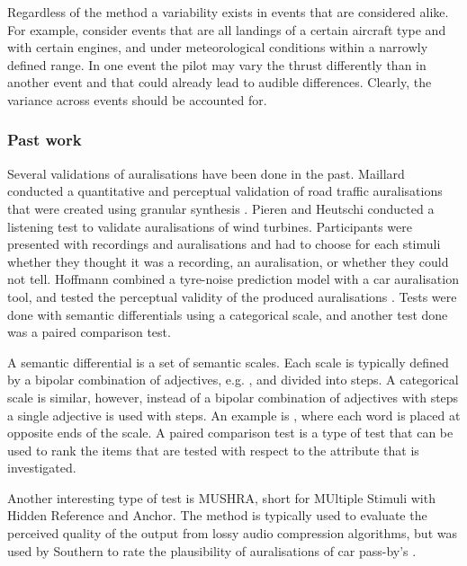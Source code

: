 Regardless of the method a variability exists in events that are considered
alike. For example, consider events that are all landings of a certain aircraft
type and with certain engines, and under meteorological conditions within a narrowly
defined range. In one event the pilot may vary the thrust differently than in
another event and that could already lead to audible differences.
Clearly, the variance across events should be accounted for.

\subsubsection*{Past work}
Several validations of auralisations have been done in the past. Maillard
conducted a quantitative and perceptual validation of road traffic auralisations
that were created using granular synthesis \cite{Maillard2014}. Pieren and
Heutschi conducted a listening test to validate auralisations of
wind turbines. Participants were presented with recordings and auralisations and
had to choose for each stimuli whether they thought it was a recording, an
auralisation, or whether they could not tell. Hoffmann combined a tyre-noise
prediction model with a car auralisation tool, and tested the perceptual
validity of the produced auralisations \cite{Hoffmann2016a,Hoffmann2016}. Tests
were done with semantic differentials using a categorical scale, and another
test done was a paired comparison test.

A semantic differential is a set of semantic scales. Each scale is typically
defined by a bipolar combination of adjectives, e.g. , and
divided into steps. A categorical scale is similar, however, instead of a
bipolar combination of adjectives with steps a single adjective is used with
steps. An example is , where each word is placed at opposite
ends of the scale. A paired comparison test is a type of test that can be used
to rank the items that are tested with respect to the attribute that is
investigated.

Another interesting type of test is MUSHRA, short for MUltiple Stimuli with
Hidden Reference and Anchor. The method is typically used to evaluate the
perceived quality of the output from lossy audio compression algorithms, but was
used by Southern to rate the plausibility of auralisations of car pass-by's
\cite{Southern2016}.

